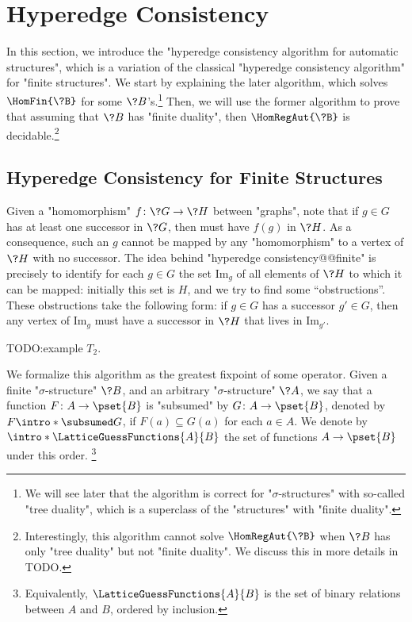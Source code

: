 \section{\AP\label{sec:hyperedge-consistency}%
	Hyperedge Consistency}

In this section, we introduce the "hyperedge consistency algorithm for automatic structures",
which is a variation of the classical "hyperedge consistency algorithm" for "finite structures".
We start by explaining the later algorithm,
which solves $\HomFin{\?B}$ for some $\?B$'s.\footnote{We will
see later that the algorithm is correct for "$\sigma$-structures" with so-called "tree duality",
which is a superclass of the "structures" with "finite duality".}
Then, we will use the former algorithm to prove that assuming that $\?B$ has "finite duality",
then $\HomRegAut{\?B}$ is decidable.\footnote{Interestingly, this algorithm cannot solve
$\HomRegAut{\?B}$ when $\?B$ has only "tree duality" but not "finite duality". 
We discuss this in more details in TODO.}

\subsection{Hyperedge Consistency for Finite Structures}

Given a "homomorphism" $f\colon \?G \to \?H$ between "graphs",
note that if $g\in G$ has at least one successor in $\?G$, then must have $f(g)$ in $\?H$.
As a consequence, such an $g$ cannot be mapped by any "homomorphism" to a vertex of $\?H$ with no
successor. The idea behind "hyperedge consistency@@finite" is precisely to identify for each
$g\in G$ the set $\textrm{Im}_g$ of all elements of $\?H$ to which it can be mapped: initially this set is $H$,
and we try to find some ``obstructions''. These obstructions take the following form:
if $g \in G$ has a successor $g' \in G$, then any vertex of $\textrm{Im}_g$
must have a successor in $\?H$ that lives in $\textrm{Im}_{g'}$.

TODO:example $T_2$.

We formalize this algorithm as the greatest fixpoint of some operator.
Given a finite "$\sigma$-structure" $\?B$, and an arbitrary%
"$\sigma$-structure" $\?A$, we say that a function $F\colon A \to \pset{B}$ is "subsumed"
by $G\colon A \to \pset{B}$, denoted by \AP\(F \intro*\subsumed G\),
if $F(a) \subseteq G(a)$ for each $a \in A$. We denote by
\AP\(\intro*\LatticeGuessFunctions{A}{B}\) the set of functions $A \to \pset{B}$ under this order.%
\footnote{Equivalently, $\LatticeGuessFunctions{A}{B}$ is the
set of binary relations between $A$ and $B$, ordered by inclusion.}

